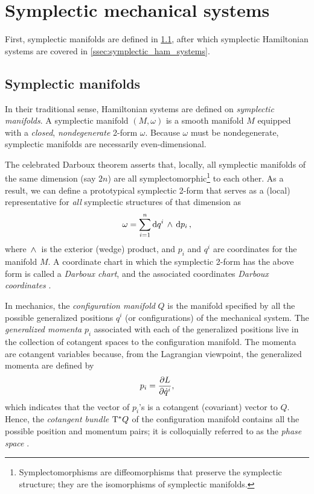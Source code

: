 \section{Symplectic mechanical systems}
\label{sec:symplectic}

First, symplectic manifolds are defined in \cref{ssec:symplectic_manifolds}, after which symplectic Hamiltonian systems are covered in \cref{ssec:symplectic_ham_systems}.

\subsection{Symplectic manifolds}
\label{ssec:symplectic_manifolds}
In their traditional sense, Hamiltonian systems are defined on \emph{symplectic manifolds}. A symplectic manifold \((M, \omega)\) is a smooth manifold \(M\) equipped with a \emph{closed}, \emph{nondegenerate} 2-form \(\omega\). Because \(\omega\) must be nondegenerate, symplectic manifolds are necessarily even-dimensional. 

The celebrated Darboux theorem asserts that, locally, all symplectic manifolds of the same dimension (say \(2n\)) are all symplectomorphic\footnote{Symplectomorphisms are diffeomorphisms that preserve the symplectic structure; they are the isomorphisms of symplectic manifolds.} to each other. As a result, we can define a prototypical symplectic 2-form that serves as a (local) representative for \emph{all} symplectic structures of that dimension as
\begin{equation}
    \omega = \sum_{i = 1}^n  \dd{q^i}\,\wedge\,\dd{p_i} ,
    \label{eq:darboux_symplectic_form}
\end{equation}
where $ \,\wedge\, $ is the exterior (wedge) product, and \(p_i\) and \(q^i\) are coordinates for the manifold \(M\). A coordinate chart in which the symplectic 2-form has the above form is called a \emph{Darboux chart}, and the associated coordinates \emph{Darboux coordinates} \cite{Cannas2001, Arnold1989}.

In mechanics, the \emph{configuration manifold} \(Q\) is the manifold specified by all the possible generalized positions \(q^i\) (or configurations) of the mechanical system. The \emph{generalized momenta} $p_i$ associated with each of the generalized positions live in the collection of cotangent spaces to the configuration manifold. The momenta are cotangent variables because, from the Lagrangian viewpoint, the generalized momenta are defined by
\begin{equation}
     p_i = \pdv{L}{\dot{q}^i},
\end{equation}
which indicates that the vector of \(p_i\)'s is a cotangent (covariant) vector to \(Q\). Hence, the \emph{cotangent bundle} $\mathrm{T}^*Q$ of the configuration manifold contains all the possible position and momentum pairs; it is colloquially referred to as the \emph{phase space} \cite{Abraham1978,Arnold1989,Libermann1987}.

